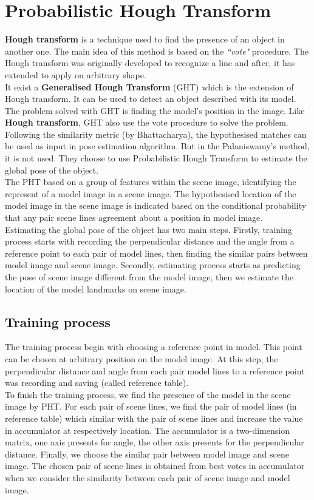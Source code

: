 \section{Probabilistic Hough Transform}
\textbf{Hough transform} is a technique used to find the presence of an object in another one. The main idea of this method is based on the \textit{``vote"} procedure. The Hough transform was originally developed to recognize a line\cite{hough1962method} and after, it has extended to apply on arbitrary shape\cite{duda1972use}.\\[0.2cm]
It exist a \textbf{Generalised Hough Transform}\cite{ballard1981generalizing} (GHT) which is the extension of Hough transform. It can be used to detect an object described with its model. The problem solved with GHT is finding the model's position in the image. Like \textbf{Hough transform}, GHT also use the vote procedure to solve the problem. Following the similarity metric (by Bhattacharya), the hypothesised matches can be used as input in pose estimation algorithm. But in the Palaniswamy's method, it is not used. They choose to use Probabilistic Hough Transform to estimate the global pose of the object\cite{ashbrook1995robust}.\\[0.3cm]
The PHT based on a group of features within the scene image, identifying the represent of a model image in a scene image. The hypothesised location of the model image in the scene image is indicated based on the conditional probability that any pair scene lines agreement about a position in model image.\\[0.3cm]
Estimating the global pose of the object has two main steps. Firstly, training process starts with recording the perpendicular distance and the angle from a reference point to each pair of model lines, then finding the similar pairs between model image and scene image. Secondly, estimating process starts as predicting the pose of scene image different from the model image, then we estimate the location of the model landmarks on scene image.
\subsection{Training process}
The training process begin with choosing a reference point in model. This point can be chosen at arbitrary position on the model image. At this step, the perpendicular distance and angle from each pair model lines to a reference point was recording and saving (called reference table). \\
To finish the training process, we find the presence of the model in the scene image by PHT. For each pair of scene lines, we find the pair of model lines (in reference table) which similar with the pair of scene lines and increase the value in accumulator at respectively location. The accumulator is a two-dimension matrix, one axis presents for angle, the other axis presents for the perpendicular distance. Finally, we choose the similar pair between model image and scene image. The chosen pair of scene lines is obtained from best votes in accumulator when we consider the similarity between each pair of scene image and model image.
